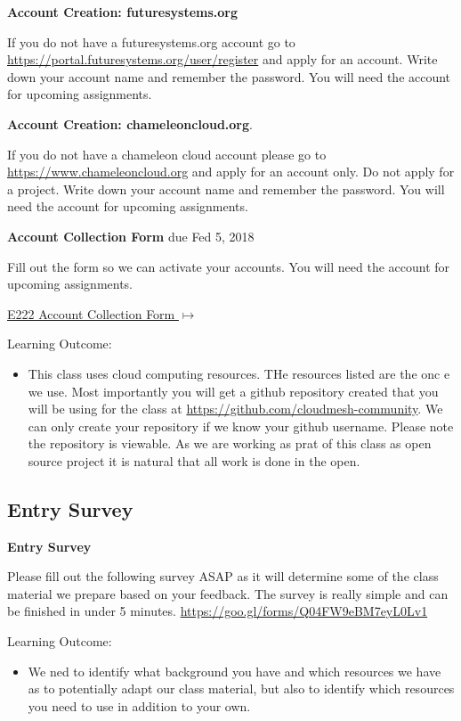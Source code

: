 \begin{exercise}

  {\bf Account Creation: futuresystems.org}
  
  If you do not have a futuresystems.org account go to
  \url{https://portal.futuresystems.org/user/register} and apply for an
  account. Write down your account name and remember the password. You
  will need the account for upcoming assignments.

\end{exercise}

\begin{exercise}
  {\bf Account Creation: chameleoncloud.org}. 
  
  If you do not have a chameleon cloud account please go to 
  \url{https://www.chameleoncloud.org} and apply for an
  account only. Do not apply for a project. Write down your account
  name and remember the password. You will need the account for
  upcoming assignments.
\end{exercise}

\begin{exercise}
   {\bf Account Collection Form } due Fed 5, 2018
 
 Fill out the form so we can activate your accounts. You will need the account for upcoming assignments.
 
  {\hfill \href{https://goo.gl/forms/W0MdgoJoY8F6Vt9Q2}{E222 Account Collection Form $\mapsto$}}
 
Learning Outcome:
\begin{itemize}
\item This class uses cloud computing resources. THe resources listed
  are the onc e we use. Most importantly you will get a github
  repository created that you will be using for the class at
  \url{https://github.com/cloudmesh-community}. We can only create
  your repository if we know your github username. Please note the
  repository is viewable. As we are working as prat of this class as
  open source project it is natural that all work is done in the open.
\end{itemize}
\end{exercise}

\subsection{Entry Survey}
\begin{exercise}
    {\bf Entry Survey}
    
 Please fill out the following survey ASAP as it will determine some
 of the class material we prepare based on your feedback. The survey
 is really simple and can be finished in under 5
 minutes. \url{https://goo.gl/forms/Q04FW9eBM7eyL0Lv1}

Learning Outcome:
\begin{itemize}
\item We ned to identify what background you have and which resources
  we have as to potentially adapt our class material, but also to
  identify which resources you need to use in addition to your own.
\end{itemize}

\end{exercise}

